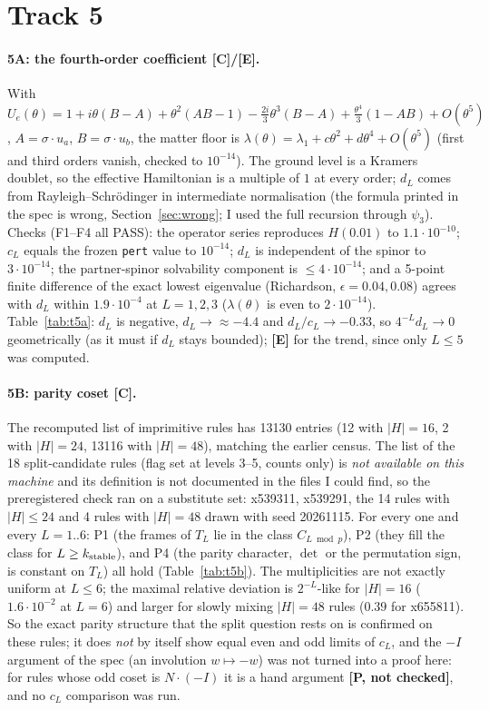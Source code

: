 \documentclass[10pt]{article}
\newcommand{\lab}[1]{\textbf{[#1]}}
\begin{document}
\section{Track 5}\label{sec:t5}
\paragraph{5A: the fourth-order coefficient \lab{C}/\lab{E}.} With $U_e(\theta)=1+i\theta(B-A)+\theta^2(AB-1)-\tfrac{2i}{3}\theta^3(B-A)+\tfrac{\theta^4}{3}(1-AB)+O(\theta^5)$, $A=\sigma\!\cdot\!u_a$, $B=\sigma\!\cdot\!u_b$, the matter floor is $\lambda(\theta)=\lambda_1+c\theta^2+d\theta^4+O(\theta^5)$ (first and third orders vanish, checked to $10^{-14}$). The ground level is a Kramers doublet, so the effective Hamiltonian is a multiple of $1$ at every order; $d_L$ comes from Rayleigh--Schr\"odinger in intermediate normalisation (the formula printed in the spec is wrong, Section~\ref{sec:wrong}; I used the full recursion through $\psi_3$). Checks (F1--F4 all PASS): the operator series reproduces $H(0.01)$ to $1.1\cdot10^{-10}$; $c_L$ equals the frozen \texttt{pert} value to $10^{-14}$; $d_L$ is independent of the spinor to $3\cdot10^{-14}$; the partner-spinor solvability component is $\le4\cdot10^{-14}$; and a 5-point finite difference of the exact lowest eigenvalue (Richardson, $\epsilon=0.04,0.08$) agrees with $d_L$ within $1.9\cdot10^{-4}$ at $L=1,2,3$ ($\lambda(\theta)$ is even to $2\cdot10^{-14}$). Table~\ref{tab:t5a}: $d_L$ is negative, $d_L\to\approx-4.4$ and $d_L/c_L\to-0.33$, so $4^{-L}d_L\to0$ geometrically (as it must if $d_L$ stays bounded); \lab{E} for the trend, since only $L\le5$ was computed.


\paragraph{5B: parity coset \lab{C}.} The recomputed list of imprimitive rules has 13130 entries (12 with $|H|=16$, 2 with $|H|=24$, 13116 with $|H|=48$), matching the earlier census. The list of the 18 split-candidate rules (flag set at levels 3--5, counts only) is \emph{not available on this machine} and its definition is not documented in the files I could find, so the preregistered check ran on a substitute set: x539311, x539291, the 14 rules with $|H|\le24$ and 4 rules with $|H|=48$ drawn with seed 20261115. For every one and every $L=1..6$: P1 (the frames of $T_L$ lie in the class $C_{L\bmod p}$), P2 (they fill the class for $L\ge k_{\rm stable}$), and P4 (the parity character, $\det$ or the permutation sign, is constant on $T_L$) all hold (Table~\ref{tab:t5b}). The multiplicities are not exactly uniform at $L\le6$; the maximal relative deviation is $2^{-L}$-like for $|H|=16$ ($1.6\cdot10^{-2}$ at $L=6$) and larger for slowly mixing $|H|=48$ rules ($0.39$ for x655811). So the exact parity structure that the split question rests on is confirmed on these rules; it does \emph{not} by itself show equal even and odd limits of $c_L$, and the $-I$ argument of the spec (an involution $w\mapsto-w$) was not turned into a proof here: for rules whose odd coset is $N\cdot(-I)$ it is a hand argument \lab{P, not checked}, and no $c_L$ comparison was run.

\end{document}

